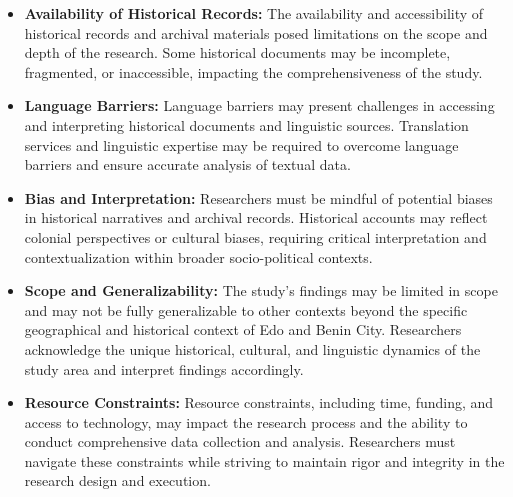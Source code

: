 \begin{itemize}
    \item \textbf{Availability of Historical Records:} The availability and accessibility of historical records and archival materials posed limitations on the scope and depth of the research. Some historical documents may be incomplete, fragmented, or inaccessible, impacting the comprehensiveness of the study.
    
    \item \textbf{Language Barriers:} Language barriers may present challenges in accessing and interpreting historical documents and linguistic sources. Translation services and linguistic expertise may be required to overcome language barriers and ensure accurate analysis of textual data.
    
    \item \textbf{Bias and Interpretation:} Researchers must be mindful of potential biases in historical narratives and archival records. Historical accounts may reflect colonial perspectives or cultural biases, requiring critical interpretation and contextualization within broader socio-political contexts.
    
    \item \textbf{Scope and Generalizability:} The study's findings may be limited in scope and may not be fully generalizable to other contexts beyond the specific geographical and historical context of Edo and Benin City. Researchers acknowledge the unique historical, cultural, and linguistic dynamics of the study area and interpret findings accordingly.
    
    \item \textbf{Resource Constraints:} Resource constraints, including time, funding, and access to technology, may impact the research process and the ability to conduct comprehensive data collection and analysis. Researchers must navigate these constraints while striving to maintain rigor and integrity in the research design and execution.
\end{itemize}



